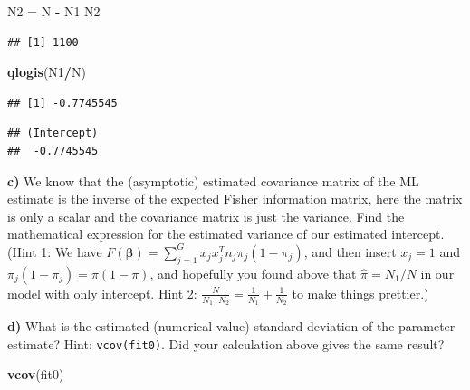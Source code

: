 \documentclass[
]{article}
\newenvironment{Shaded}{\begin{snugshade}}{\end{snugshade}}
\newcommand{\FunctionTok}[1]{\textcolor[rgb]{0.13,0.29,0.53}{\textbf{#1}}}
\newcommand{\NormalTok}[1]{#1}
\newcommand{\OtherTok}[1]{\textcolor[rgb]{0.56,0.35,0.01}{#1}}
\newcommand{\SpecialCharTok}[1]{\textcolor[rgb]{0.81,0.36,0.00}{\textbf{#1}}}
\begin{document}
\begin{Shaded}
\begin{Highlighting}[]
\NormalTok{N2 }\OtherTok{=}\NormalTok{ N }\SpecialCharTok{{-}}\NormalTok{ N1}
\NormalTok{N2}
\end{Highlighting}
\end{Shaded}

\begin{verbatim}
## [1] 1100
\end{verbatim}

\begin{Shaded}
\begin{Highlighting}[]
\FunctionTok{qlogis}\NormalTok{(N1}\SpecialCharTok{/}\NormalTok{N)}
\end{Highlighting}
\end{Shaded}

\begin{verbatim}
## [1] -0.7745545
\end{verbatim}

\begin{Shaded}
\end{Shaded}

\begin{verbatim}
## (Intercept) 
##  -0.7745545
\end{verbatim}

\textbf{c)} We know that the (asymptotic) estimated covariance matrix of
the ML estimate is the inverse of the expected Fisher information
matrix, here the matrix is only a scalar and the covariance matrix is
just the variance. Find the mathematical expression for the estimated
variance of our estimated intercept. (Hint 1: We have
\(F(\boldsymbol{\beta}) = \sum_{j=1}^G x_jx_j^T n_j \pi_j(1-\pi_j)\),
and then insert \(x_j = 1\) and \(\pi_j(1-\pi_j)=\pi(1-\pi)\), and
hopefully you found above that \(\hat{\pi}=N_1/N\) in our model with
only intercept. Hint 2:
\(\frac{N}{N_1 \cdot N_2}=\frac{1}{N_1}+\frac{1}{N_2}\) to make things
prettier.)

\textbf{d)} What is the estimated (numerical value) standard deviation
of the parameter estimate? Hint: \texttt{vcov(fit0)}. Did your
calculation above gives the same result?

\begin{Shaded}
\begin{Highlighting}[]
\FunctionTok{vcov}\NormalTok{(fit0)}
\end{Highlighting}
\end{Shaded}
\end{document}
